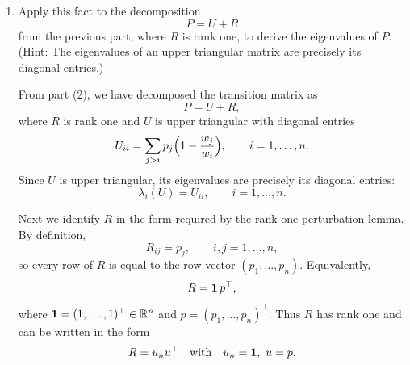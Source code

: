 \documentclass[answers,12pt,addpoints]{exam}
\begin{document}
\begin{enumerate}
\begin{solution}
Compute $B \tilde u_j$:
\begin{align*}
B \tilde u_j
&= (A + u_n u^\top)(u_j + c_j u_n) \\
&= A u_j + c_j A u_n + u_n u^\top u_j + c_j u_n u^\top u_n \\
&= \lambda_j u_j + c_j \lambda_n u_n
   + u_n (u^\top u_j) + c_j u_n (u^\top u_n).
\end{align*}
Group terms in the basis $\{u_j,u_n\}$:
\[
B \tilde u_j
= \lambda_j u_j
  + u_n\bigl(c_j \lambda_n + u^\top u_j + c_j u^\top u_n\bigr).
\]

On the other hand, if $\tilde u_j$ is an eigenvector of $B$ with
eigenvalue $\lambda_j$, then
\[
B \tilde u_j = \lambda_j \tilde u_j
= \lambda_j (u_j + c_j u_n)
= \lambda_j u_j + c_j \lambda_j u_n.
\]
Comparing coefficients of $u_j$ and $u_n$ gives:
\[
c_j \lambda_n + u^\top u_j + c_j u^\top u_n = c_j \lambda_j.
\]
Rearranging,
\[
u^\top u_j
= c_j\bigl(\lambda_j - \lambda_n - u^\top u_n\bigr),
\]
and hence
\[
c_j = \frac{u^\top u_j}{\lambda_j - \lambda_n - u^\top u_n}.
\]
By assumption, the denominator is nonzero for all $j=1,\dots,n-1$, so
each $c_j$ is well-defined. Therefore, for every $j\neq n$, the vector
$\tilde u_j = u_j + c_j u_n$ is an eigenvector of $B$ with eigenvalue
$\lambda_j$.

\medskip
Combining the two cases, $B$ has eigenvalues
$\lambda_1,\dots,\lambda_{n-1},\lambda_n + u^\top u_n$ with
corresponding eigenvectors as claimed.
    \end{solution}
    \item Apply this fact to the decomposition
    \[
    P = U + R
    \]
    from the previous part, where $R$ is rank one, to derive the eigenvalues of $P$. (Hint: The eigenvalues of an upper triangular matrix are precisely its diagonal entries.)
    \begin{solution}
From part (2), we have decomposed the transition matrix as
\[
P = U + R,
\]
where $R$ is rank one and $U$ is upper triangular with diagonal entries
\[
U_{ii} = \sum_{j>i} p_j\Bigl(1 - \frac{w_j}{w_i}\Bigr), \qquad i = 1,\dots,n.
\]
Since $U$ is upper triangular, its eigenvalues are precisely its diagonal
entries:
\[
\lambda_i(U) = U_{ii},\qquad i = 1,\dots,n.
\]

Next we identify $R$ in the form required by the rank-one perturbation lemma.
By definition,
\[
R_{ij} = p_j,\qquad i,j = 1,\dots,n,
\]
so every row of $R$ is equal to the row vector $(p_1,\dots,p_n)$.
Equivalently,
\[
R = {\bf 1}\, p^{\top},
\]
where ${\bf 1} = (1,\dots,1)^{\top}\in\mathbb{R}^n$ and
$p = (p_1,\dots,p_n)^{\top}$. Thus $R$ has rank one and can be written
in the form
\[
R = u_n u^{\top} \quad\text{with}\quad u_n = {\bf 1},\ u = p.
\]


\end{solution}
\end{enumerate}
\end{document}
